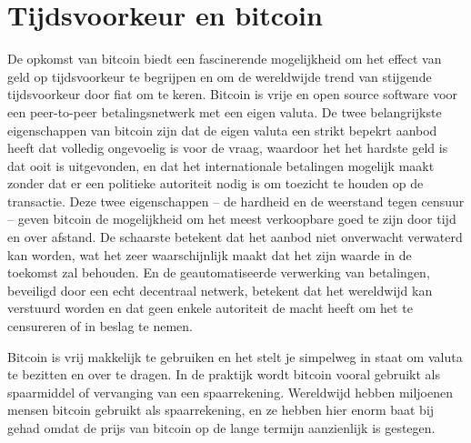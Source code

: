 \hypertarget{tijdsvoorkeur-en-bitcoin}{%
\section{Tijdsvoorkeur en bitcoin}\label{tijdsvoorkeur-en-bitcoin}}

De opkomst van bitcoin biedt een fascinerende mogelijkheid om het effect van geld op tijdsvoorkeur te begrijpen en om de wereldwijde trend van stijgende tijdsvoorkeur door fiat om te keren. Bitcoin is vrije en open source software voor een peer-to-peer betalingsnetwerk met een eigen valuta. De twee belangrijkste eigenschappen van bitcoin zijn dat de eigen valuta een strikt bepekrt aanbod heeft dat volledig ongevoelig is voor de vraag, waardoor het het hardste geld is dat ooit is uitgevonden, en dat het internationale betalingen mogelijk maakt zonder dat er een politieke autoriteit nodig is om toezicht te houden op de transactie. Deze twee eigenschappen -- de hardheid en de weerstand tegen censuur -- geven bitcoin de mogelijkheid om het meest verkoopbare goed te zijn door tijd en over afstand. De schaarste betekent dat het aanbod niet onverwacht verwaterd kan worden, wat het zeer waarschijnlijk maakt dat het zijn waarde in de toekomst zal behouden. En de geautomatiseerde verwerking van betalingen, beveiligd door een echt decentraal netwerk, betekent dat het wereldwijd kan verstuurd worden en dat geen enkele autoriteit de macht heeft om het te censureren of in beslag te nemen.

Bitcoin is vrij makkelijk te gebruiken en het stelt je simpelweg in staat om valuta te bezitten en over te dragen. In de praktijk wordt bitcoin vooral gebruikt als spaarmiddel of vervanging van een spaarrekening. Wereldwijd hebben miljoenen mensen bitcoin gebruikt als spaarrekening, en ze hebben hier enorm baat bij gehad omdat de prijs van bitcoin op de lange termijn aanzienlijk is gestegen.

